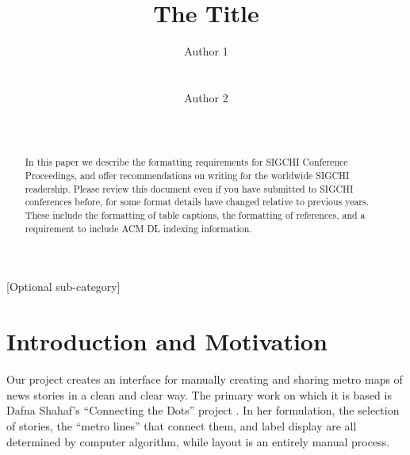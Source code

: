\documentclass{chi2009}
\begin{document}
\setlength{\paperheight}{11in}
\setlength{\paperwidth}{8.5in}
\setlength{\pdfpageheight}{\paperheight}
\setlength{\pdfpagewidth}{\paperwidth}


\title{The Title}
\author{
  \alignauthor Author 1\\
    \\
    \\
  \alignauthor Author 2\\
    \\
    \\
}

\maketitle

\begin{abstract}
  In this paper we describe the formatting requirements for SIGCHI
  Conference Proceedings, and offer recommendations on writing for the
  worldwide SIGCHI readership.  Please review this document even if
  you have submitted to SIGCHI conferences before, for some format
  details have changed relative to previous years. These include the
  formatting of table captions, the formatting of references, and a
  requirement to include ACM DL indexing information.
\end{abstract}


[Optional sub-category]

\section{Introduction and Motivation}

Our project creates an interface for manually creating and sharing metro maps of news stories in a clean and clear way. The primary work on which it is based is Dafna Shahaf's “Connecting the Dots” project \cite{}. In her formulation, the selection of stories, the “metro lines” that connect them, and label display are all determined by computer algorithm, while layout is an entirely manual process.
\end{document}
